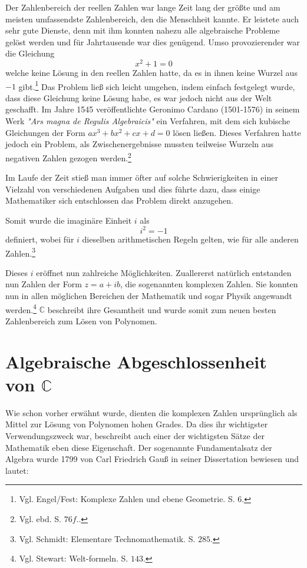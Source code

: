 \documentclass[a4paper,12pt]{article} %
\begin{document}
Der Zahlenbereich der reellen Zahlen war lange Zeit lang der größte und am meisten umfassendste Zahlenbereich, den die Menschheit kannte.
Er leistete auch sehr gute Dienste, denn mit ihm konnten nahezu alle algebraische Probleme gelöst werden und für Jahrtausende war dies genügend.
Umso provozierender war die Gleichung 
\[x^2+1=0\]
welche keine Lösung in den reellen Zahlen hatte, da es in ihnen keine Wurzel aus $-1$ gibt.\footnote{Vgl. Engel/Fest: Komplexe Zahlen und ebene Geometrie. S. $6$.}
Das Problem ließ sich leicht umgehen, indem einfach festgelegt wurde, dass diese Gleichung keine Lösung habe, es war jedoch nicht aus der Welt geschafft.
Im Jahre 1545 veröffentlichte Geronimo Cardano (1501-1576) in seinem Werk \emph{"{Ars} magna de Regulis Algebraicis"} ein Verfahren, mit dem sich kubische Gleichungen der Form $ax^3+bx^2+cx+d=0$ lösen ließen.
Dieses Verfahren hatte jedoch ein Problem, als Zwischenergebnisse mussten teilweise Wurzeln aus negativen Zahlen gezogen werden.\footnote{Vgl. ebd. S. $76 f.$.} 

Im Laufe der Zeit stieß man immer öfter auf solche Schwierigkeiten in einer Vielzahl von verschiedenen Aufgaben und dies führte dazu, dass einige Mathematiker sich entschlossen das Problem direkt anzugehen.

Somit wurde die imaginäre Einheit $i$ als
\[i^2=-1\]
definiert, wobei für $i$ dieselben arithmetischen Regeln gelten, wie für alle anderen Zahlen.\footnote{Vgl. Schmidt: Elementare Technomathematik. S. $285$.}


Dieses $i$ eröffnet nun zahlreiche Möglichkeiten.
Zuallererst natürlich entstanden nun Zahlen der Form $z=a+ib$, die sogenannten komplexen Zahlen.
Sie konnten nun in allen möglichen Bereichen der Mathematik und sogar Physik angewandt werden.\footnote{Vgl. Stewart: Welt-formeln. S. $143$.}
$\mathbb{C}$ beschreibt ihre Gesamtheit und wurde somit zum neuen besten Zahlenbereich zum Lösen von Polynomen.


\section{Algebraische Abgeschlossenheit von $\mathbb{C}$}

Wie schon vorher erwähnt wurde, dienten die komplexen Zahlen ursprünglich als Mittel zur Lösung von Polynomen hohen Grades.
Da dies ihr wichtigster Verwendungszweck war, beschreibt auch einer der wichtigsten Sätze der Mathematik eben diese Eigenschaft.
Der sogenannte Fundamentalsatz der Algebra wurde 1799 von Carl Friedrich Gauß in seiner Dissertation bewiesen und lautet:\\
\end{document}
